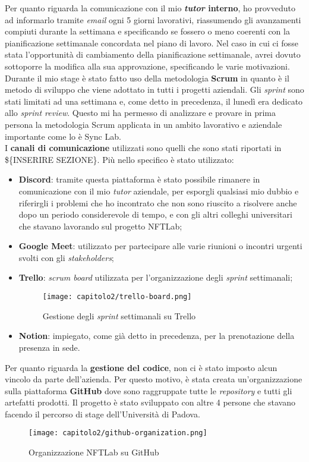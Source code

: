 Per quanto riguarda la comunicazione con il mio \textbf{\emph{tutor} interno}, ho provveduto ad informarlo tramite \emph{email} ogni 5 giorni lavorativi, riassumendo gli avanzamenti compiuti durante la settimana e specificando se fossero o meno coerenti con la pianificazione settimanale concordata nel piano di lavoro. Nel caso in cui ci fosse stata l'opportunità di cambiamento della pianificazione settimanale, avrei dovuto sottoporre la modifica alla sua approvazione, specificando le varie motivazioni. \\

Durante il mio stage è stato fatto uso della metodologia \textbf{Scrum} in quanto è il metodo di sviluppo che viene adottato in tutti i progetti aziendali. Gli \emph{sprint} sono stati limitati ad una settimana e, come detto in precedenza, il lunedì era dedicato allo \emph{sprint review}. Questo mi ha permesso di analizzare e provare in prima persona la metodologia Scrum applicata in un ambito lavorativo e aziendale importante come lo è Sync Lab. \\

I \textbf{canali di comunicazione} utilizzati sono quelli che sono stati riportati in \$\{INSERIRE SEZIONE\}. Più nello specifico è stato utilizzato:
\begin{itemize}
  \item \textbf{Discord}: tramite questa piattaforma è stato possibile rimanere in comunicazione con il mio \emph{tutor} aziendale, per esporgli qualsiasi mio dubbio e riferirgli i problemi che ho incontrato che non sono riuscito a risolvere anche dopo un periodo considerevole di tempo, e con gli altri colleghi universitari che stavano lavorando sul progetto NFTLab;
  \item \textbf{Google Meet}: utilizzato per partecipare alle varie riunioni o incontri urgenti svolti con gli \emph{stakeholders};
  \item \textbf{Trello}: \emph{scrum board} utilizzata per l'organizzazione degli \emph{sprint} settimanali;
  
  \clearpage
  \begin{figure}[!h]
    \centering
    \texttt{[image: capitolo2/trello-board.png]}
    \caption{Gestione degli \emph{sprint} settimanali su Trello}
  \end{figure}

  \item \textbf{Notion}: impiegato, come già detto in precedenza, per la prenotazione della presenza in sede.
\end{itemize}

Per quanto riguarda la \textbf{gestione del codice}, non ci è stato imposto alcun vincolo da parte dell'azienda. Per questo motivo, è stata creata un'organizzazione sulla piattaforma \textbf{GitHub} dove sono raggruppate tutte le \emph{repository} e tutti gli artefatti prodotti. Il progetto è stato sviluppato con altre 4 persone che stavano facendo il percorso di stage dell'Università di Padova.

\begin{figure}[!h]
  \centering
  \texttt{[image: capitolo2/github-organization.png]}
  \caption{Organizzazione NFTLab su GitHub}
\end{figure}

